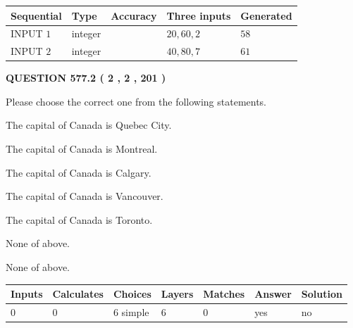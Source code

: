 \documentclass[12pt]{article}
\begin{document}
   
  
  
\noindent\begin{tabular}{|l|l|l|l|l|}
\hline
 Sequential & Type & Accuracy & Three inputs & Generated \\ 
\hline
 
 
  INPUT $  1 $ & integer &  & $
 20
 , 
 60
 , 
 2
 $ & $ 58 $ 
 \\  \hline  
 
 
  INPUT $  2 $ & integer &  & $
 40
 , 
 80
 , 
 7
 $ & $ 61 $ 
 \\  \hline  
 \end{tabular}
   
   
  
\vspace{0.2in}
  
{\textbf{\Large{QUESTION
577.2 
 ( 2 , 2 , 201 )
}}}
  
  
Please choose the correct one from the following statements.
 
 
The capital of Canada is Quebec City.
 
 
The capital of Canada is Montreal.
 
 
The capital of Canada is Calgary.
 
 
The capital of Canada is Vancouver.
 
 
The capital of Canada is Toronto.
 
 
 None of above.
 
 
\noindent{}
 
 
 None of above.
 
 
\noindent{}
 
 
   
   
   
   
\noindent\begin{tabular}{|l|l|l|l|l|l|l|}
 \hline
Inputs & Calculates & Choices & Layers & Matches & Answer & Solution \\ \hline
 0  & 
 0  & 
 6
  simple  
  & 
 6  & 
 0  & 
  yes & 
  no 
  \\ \hline
 \end{tabular}
   
\end{document}

